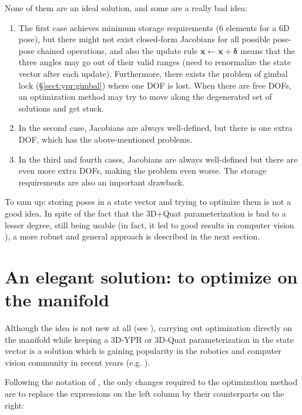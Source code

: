 \documentclass[a4paper,11pt]{report}
\newcommand{\DEL}{{\bm{\delta}}}
\begin{document}
None of them are an ideal solution, and some are a really bad idea:

\begin{enumerate}
 \item The first case achieves minimum storage requirements (6 elements for a 6D pose), 
but there might not exist closed-form Jacobians for all possible pose-pose chained operations, 
and also the update rule $\mathbf{x}  \leftarrow \mathbf{x} + \DEL$ means that the three 
angles may go out of their valid ranges (need to renormalize the state vector after each update).
Furthermore, there exists the problem of gimbal lock (\S \ref{sect:ypr:gimbal}) where one
DOF is lost. When there are free DOFs, an optimization method may try to move along the 
degenerated set of solutions and get stuck.

\item In the second case, Jacobians are always well-defined, but there is one extra DOF, which has 
the above-mentioned problems.

\item In the third and fourth cases, Jacobians are always well-defined but there are 
even more extra DOFs, making the problem even worse. The storage requirements are also an 
important drawback.
\end{enumerate}

To sum up: storing poses in a state vector and trying to optimize 
them is not a good idea.  
In spite of the fact that 
the 3D+Quat parameterization is bad to a lesser degree, 
still being usable 
(in fact, it led to good results in computer vision \cite{davison2007mrt}),
a more robust and general approach is described in the next section.


\section{An elegant solution: to optimize on the manifold}
\label{sect:opti_manif}

Although the idea is not new at all (see \cite{gabay1982mdf}), 
carrying out optimization directly on the manifold while 
keeping a 3D-YPR or 3D-Quat parameterization in the 
state vector is a solution which is gaining popularity 
in the robotics and computer vision community in recent years
(e.g. \cite{hertzberg2008fsm,strasdat2010scale}).

Following the notation of \cite{hertzberg2008fsm}, the only changes required 
to the optimization method are 
to replace the expressions on the left column by their counterparts on the right:
\end{document}
